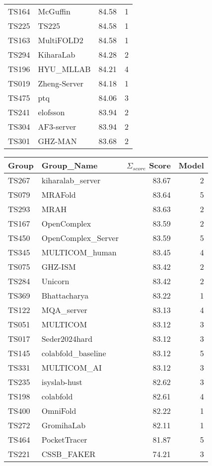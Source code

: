 \begin{table*}[ht]
\begin{minipage}[t]{0.48\textwidth}
\begin{tabular}{llrr}
TS164 & McGuffin & 84.58 & 1 \\ 
TS225 & TS225 & 84.58 & 1 \\ 
TS163 & MultiFOLD2 & 84.58 & 1 \\ 
TS294 & KiharaLab & 84.28 & 2 \\ 
TS196 & HYU\_MLLAB & 84.21 & 4 \\ 
TS019 & Zheng-Server & 84.18 & 1 \\ 
TS475 & ptq & 84.06 & 3 \\ 
TS241 & elofsson & 83.94 & 2 \\ 
TS304 & AF3-server & 83.94 & 2 \\ 
TS301 & GHZ-MAN & 83.68 & 2 \\ 
\bottomrule
\end{tabular}
\end{minipage}
\hfill
\begin{minipage}[t]{0.48\textwidth}
\centering
\begin{tabular}{llrr}
\toprule
Group & Group\_Name & $\Sigma_{score}$ Score & Model \\ 
\midrule
TS267 & kiharalab\_server & 83.67 & 2 \\ 
TS079 & MRAFold & 83.64 & 5 \\ 
TS293 & MRAH & 83.63 & 2 \\ 
TS167 & OpenComplex & 83.59 & 2 \\ 
TS450 & OpenComplex\_Server & 83.59 & 5 \\ 
TS345 & MULTICOM\_human & 83.45 & 4 \\ 
TS075 & GHZ-ISM & 83.42 & 2 \\ 
TS284 & Unicorn & 83.42 & 2 \\ 
TS369 & Bhattacharya & 83.22 & 1 \\ 
TS122 & MQA\_server & 83.13 & 4 \\ 
TS051 & MULTICOM & 83.12 & 3 \\ 
TS017 & Seder2024hard & 83.12 & 3 \\ 
TS145 & colabfold\_baseline & 83.12 & 5 \\ 
TS331 & MULTICOM\_AI & 83.12 & 3 \\ 
TS235 & isyslab-hust & 82.62 & 3 \\ 
TS198 & colabfold & 82.61 & 4 \\ 
TS400 & OmniFold & 82.22 & 1 \\ 
TS272 & GromihaLab & 82.11 & 1 \\ 
TS464 & PocketTracer & 81.87 & 5 \\ 
TS221 & CSSB\_FAKER & 74.21 & 3 \\ 

\end{tabular}
\end{minipage}
\end{table*}
